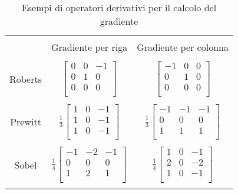 \begin{table}
\label{tab:gradiente}
\center
\caption{Esempi di operatori derivativi per il calcolo del gradiente}
\begin{tabular}{ccc}
 &&\\  
 & Gradiente per riga & Gradiente per colonna \\
 &&\\ 
Roberts & $\left [\begin{matrix}
0 & 0 & -1\\

0 & 1 & 0\\

0  & 0 & 0\\
\end{matrix}\right ]$& $\left[ \begin{matrix}
-1 & 0 & 0\\

0 & 1 & 0\\

0  & 0 & 0\\
\end{matrix}\right ] $ \\ 
&&\\
Prewitt
&
$\frac{1}{3}\left [
\begin{matrix}
1& 0 &-1\\
1 &0& -1\\
1 &0& -1\\
\end{matrix}\right ]$
&
$\frac{1}{3}\left [\begin{matrix}
-1 &-1& -1\\
0  &0&  0\\
1  &1&  1\\
\end{matrix}\right ]$\\
&&\\
Sobel
&
$\frac{1}{4}\left [
\begin{matrix}
-1& -2 &-1\\
0 & 0 & 0\\
1 & 2 & 1\\
\end{matrix}\right ]$
&
$\frac{1}{4}\left [\begin{matrix}
1 & 0 & -1\\
2 & 0 & -2\\
1 & 0 & -1\\
\end{matrix}\right ]$\\
&&\\
\end{tabular} 
\end{table}

